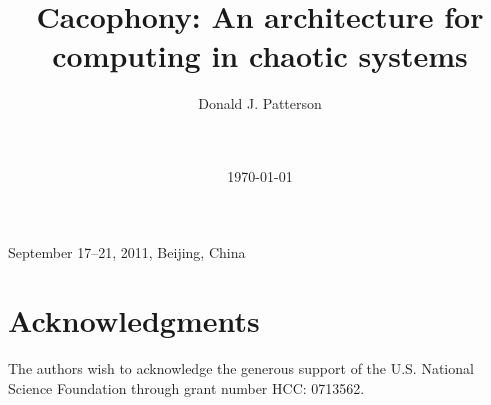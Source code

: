 \documentclass{chi2008}
\title{Cacophony: An architecture for computing in chaotic systems}
\author{
\alignauthor
Donald J. Patterson\\
       \affaddr{Department of Informatics}\\
       \affaddr{University of California, Irvine, USA}\\
       \email{ \{djp3\}@uci.edu}
}
\begin{document}
 {September 17--21, 2011, Beijing, China} 





\date{\today}

\maketitle







\section{Acknowledgments}
The authors wish to acknowledge the generous support of the U.S. National
Science Foundation through grant number HCC: 0713562.



\balancecolumns
\end{document}
